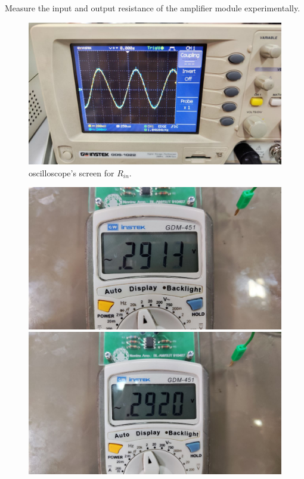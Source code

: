 \documentclass[11pt]{article}
\newcommand{\PicScale}{0.2}
\begin{document}
\begin{question}
\begin{subquestion}{Measure the input and output resistance of the amplifier module experimentally.}
{            \begin{figure}[H]
                \centering
                \includegraphics[scale=\PicScale,angle=0]{Fig/45.jpeg}
                \caption{oscilloscope's screen for $R_{in}$.}
            \end{figure}
            \begin{figure}[H]
                \centering
                \includegraphics[scale=0.1,angle=0]{Fig/46.jpeg}
                \includegraphics[scale=0.1,angle=0]{Fig/47.jpeg}

\end{figure}}
\end{subquestion}
\end{question}
\end{document}
